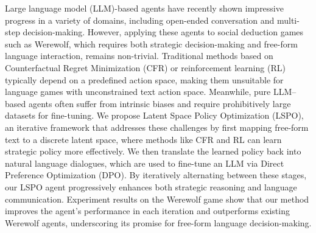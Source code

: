 Large language model (LLM)-based agents have recently shown impressive progress in a variety of domains, including open-ended conversation and multi-step decision-making. However, applying these agents to social deduction games such as Werewolf, which requires both strategic decision-making and free-form language interaction, remains non-trivial. Traditional methods based on Counterfactual Regret Minimization (CFR) or reinforcement learning (RL) typically depend on a predefined action space, making them unsuitable for language games with unconstrained text action space. Meanwhile, pure LLM–based agents often suffer from intrinsic biases and require prohibitively large datasets for fine-tuning. We propose Latent Space Policy Optimization (LSPO), an iterative framework that addresses these challenges by first mapping free-form text to a discrete latent space, where methods like CFR and RL can learn strategic policy more effectively. We then translate the learned policy back into natural language dialogues, which are used to fine-tune an LLM via Direct Preference Optimization (DPO). By iteratively alternating between these stages, our LSPO agent progressively enhances both strategic reasoning and language communication. Experiment results on the Werewolf game show that our method improves the agent's performance in each iteration and outperforms existing Werewolf agents, underscoring its promise for free-form language decision-making.

